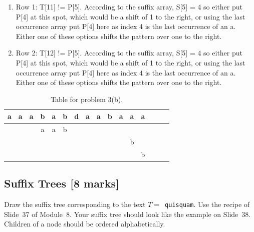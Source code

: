 \documentclass[12pt]{article}
\begin{document}
\begin{itemize}
\begin{enumerate}
\item Row 1: T[11] != P[5]. According to the suffix array, S[5] = 4 so either put P[4] at this spot, which would be a shift of 1 to the right, or using the last occurrence array put P[4] here as index 4 is the last occurrence of an a. Either one of these options shifts the pattern over one to the right.

\item Row 2: T[12] != P[5]. According to the suffix array, S[5] = 4 so either put P[4] at this spot, which would be a shift of 1 to the right, or using the last occurrence array put P[4] here as index 4 is the last occurrence of an a. Either one of these options shifts the pattern over one to the right.
\end{enumerate}



\begin{table}[!ht]
\Large{
\begin{center}
\begin{tabular}{|c|c|c|c|c|c|c|c|c|c|c|c|c|c|c|c|}
\hline
a&a&a&b&a&b&d&a&a&b&a&a&a\\
\hline
&&&a&a&b&&&&&&&\\
\hline
&&&&&&&&&&&b&\\
\hline
&&&&&&&&&&&&b\\

\hline
\end{tabular}
\end{center}}
\caption{Table for problem 3(b).}\label{kmp}
\end{table}
\end{itemize}

\subsection{Suffix Trees [8 marks]} 
Draw the suffix tree corresponding to the text
$T =$\verb[ quisquam[.  Use the recipe of Slide~37 of Module~8.
Your suffix tree should look like the example on Slide~38.
Children of a node should be ordered alphabetically.

\end{document}
